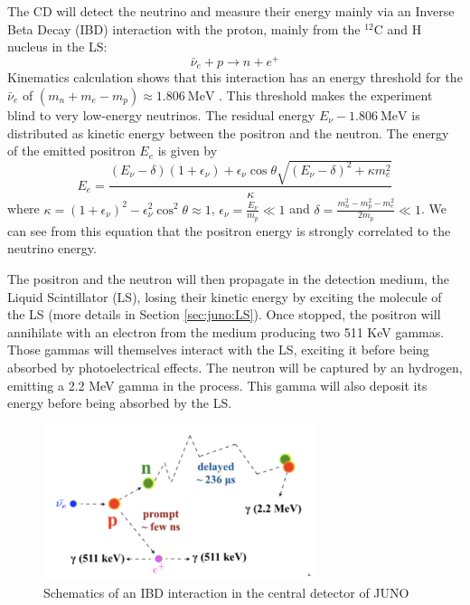 \documentclass[../main.tex]{subfiles}
\begin{document}
The CD will detect the neutrino and measure their energy mainly via an Inverse Beta Decay (IBD) interaction with the proton, mainly from the $^{12}$C and H nucleus in the LS:
\begin{equation*}
  \bar{\nu}_e + p \rightarrow n + e^+
\end{equation*}
Kinematics calculation shows that this interaction has an energy threshold for the $\bar{\nu}_e$ of $ (m_n + m_e - m_p ) \approx 1.806 ~ \mathrm{MeV}$ \cite{strumia_precise_2003}.
This threshold makes the experiment blind to very low-energy neutrinos. The residual energy $E_{\nu} - 1.806 ~ \mathrm{MeV}$ is distributed as kinetic energy between the positron and the neutron.
The energy of the emitted positron $E_e$ is given by \cite{strumia_precise_2003}
\begin{equation}
  E_e = \frac{(E_\nu - \delta)(1+\epsilon_\nu) + \epsilon_\nu \cos \theta \sqrt{(E_\nu - \delta)^2 + \kappa m_e^2}}{\kappa}
\end{equation}
where $\kappa = (1 + \epsilon_\nu)^2 - \epsilon_\nu^2 \cos^2 \theta \approx 1$, $\epsilon_\nu = \frac{E_\nu}{m_p} \ll 1$ and $\delta = \frac{m_n^2 - m_p^2 - m_e^2}{2m_p} \ll 1$.
We can see from this equation that the positron energy is strongly correlated to the neutrino energy.


The positron and the neutron will then propagate in the detection medium, the Liquid Scintillator (LS), losing their kinetic energy by exciting the molecule of the LS (more details in Section \ref{sec:juno:LS}). Once stopped, the positron will annihilate with an electron from the medium producing two 511 KeV gammas. Those gammas will themselves interact with the LS, exciting it before being absorbed by photoelectrical effects. The neutron will be captured by an hydrogen, emitting a 2.2 MeV gamma in the process. This gamma will also deposit its energy before being absorbed by the LS.

\begin{figure}[ht]
  \centering
  \includegraphics[width=8cm]{images/juno/IDB-JUNO.png}
  \caption{Schematics of an IBD interaction in the central detector of JUNO}
  \label{fig:juno:IBD}
\end{figure}
\end{document}
